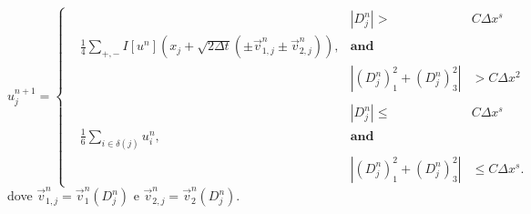 \begin{equation}
  \label{eq:mcm-schema}
  u_j^{n+1}=
  \left\{
  \begin{aligned}
    &   &\scriptstyle|D_j^n|>&\scriptstyle C\Delta x^s\\ 
    &\frac{1}{4}\sum_{+,-}I[u^n](x_j+\sqrt{2\Delta t}(\pm\vec{v}_{1,j}^n\pm\vec{v}_{2,j}^n)),  &\scriptstyle\mathbf{and} \\
    &  &\scriptstyle|(D_j^n)_1^2+(D_j^n)_3^2|&\scriptstyle >C\Delta x^2 \\
    &  &  \\
    &  &\scriptstyle|D_j^n|\leq&\scriptstyle C\Delta x^s \\
     & \frac{1}{6}\sum_{i\in\delta(j)}u_i^n,   &\scriptstyle\mathbf{and} \\
  &  &\scriptstyle|(D_j^n)_1^2+(D_j^n)_3^2| &\scriptstyle\leq C\Delta x^s.
  \end{aligned}   
  \right.
\end{equation}
dove $\vec{v}_{1,j}^n=\vec{v}_1^n(D_j^n)$ e $\vec{v}_{2,j}^n=\vec{v}_2^n(D_j^n)$. 

%
